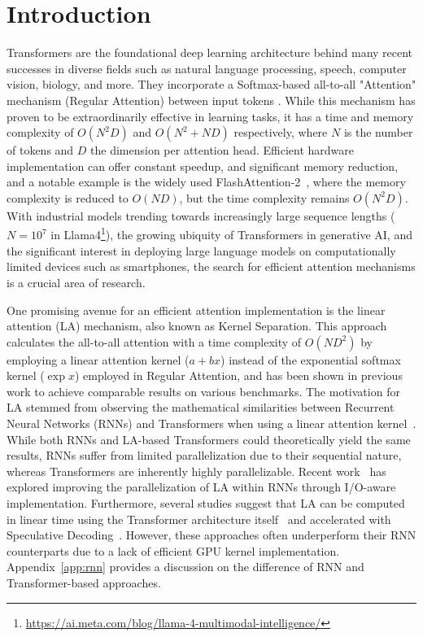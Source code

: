 \section{Introduction}
Transformers are the foundational deep learning architecture behind many recent successes in diverse fields such as natural language processing, speech, computer vision, biology, and more. They incorporate a Softmax-based all-to-all "Attention" mechanism (Regular Attention) between input tokens \cite{Vaswani2017-vf}. While this mechanism has proven to be extraordinarily effective in learning tasks, it has a time and memory complexity of $O(N^2D)$ and $O(N^2+ND)$ respectively, where $N$ is the number of tokens and $D$ the dimension per attention head. Efficient hardware implementation can offer constant speedup, and significant memory reduction, and a notable example is the widely used FlashAttention-2~\cite{dao2024flashattention,dao2022flashattention}, where the memory complexity is reduced to $O(ND)$, but the time complexity remains $O(N^2D)$. With industrial models trending towards increasingly large sequence lengths ($N=10^7$ in Llama4\footnote{\url{https://ai.meta.com/blog/llama-4-multimodal-intelligence/}}), the growing ubiquity of Transformers in generative AI, and the significant interest in deploying large language models on computationally limited devices such as smartphones, the search for efficient attention mechanisms is a crucial area of research.


\par One promising avenue for an efficient attention implementation is the linear attention (LA) mechanism, also known as Kernel Separation. This approach calculates the all-to-all attention with a time complexity of $O(ND^2)$ by employing a linear attention kernel ($a+bx$) instead of the exponential softmax kernel ($\exp{x}$) employed in Regular Attention, and has been shown in previous work to achieve comparable results on various benchmarks. The motivation for LA stemmed from observing the mathematical similarities between Recurrent Neural Networks (RNNs) and Transformers when using a linear attention kernel~\cite{pmlr-v119-katharopoulos20a}. While both RNNs and LA-based Transformers could theoretically yield the same results, RNNs suffer from limited parallelization due to their sequential nature, whereas Transformers are inherently highly parallelizable. Recent work~\cite{yang2023gated} has explored improving the parallelization of LA within RNNs through I/O-aware implementation. Furthermore, several studies suggest that LA can be computed in linear time using the Transformer architecture itself~\cite{han2023flatten, cai2022efficientvit, zhang2024hedgehog, wangLinformerSelfAttentionLinear2020, shen2021efficient} and accelerated with Speculative Decoding~\cite{you2024linear}. However, these approaches often underperform their RNN counterparts due to a lack of efficient GPU kernel implementation. Appendix~\ref{app:rnn} provides a discussion on the difference of RNN and Transformer-based approaches.

